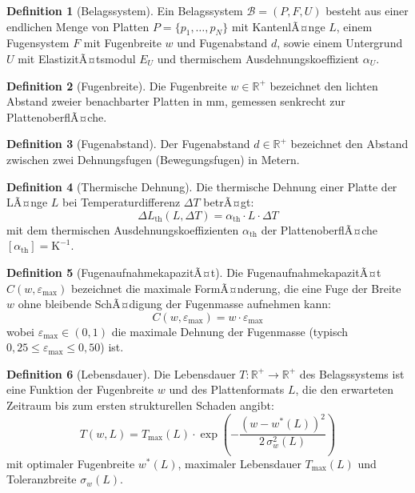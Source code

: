 ﻿\documentclass[a4paper,12pt]{article}
\theoremstyle{definition}
\newtheorem{definition}{Definition}
\begin{document}
\begin{definition}[Belagssystem]
	Ein Belagssystem $\mathcal{B} = (P, F, U)$ besteht aus einer endlichen
	Menge von Platten $P = \{p_1, \ldots, p_N\}$ mit KantenlÃ¤nge $L$,
	einem Fugensystem $F$ mit Fugenbreite $w$ und Fugenabstand $d$,
	sowie einem Untergrund $U$ mit ElastizitÃ¤tsmodul $E_U$ und
	thermischem Ausdehnungskoeffizient $\alpha_U$.
\end{definition}

\begin{definition}[Fugenbreite]
	Die Fugenbreite $w \in \mathbb{R}^+$ bezeichnet den lichten Abstand
	zweier benachbarter Platten in mm, gemessen senkrecht zur
	PlattenoberflÃ¤che.
\end{definition}

\begin{definition}[Fugenabstand]
	Der Fugenabstand $d \in \mathbb{R}^+$ bezeichnet den Abstand
	zwischen zwei Dehnungsfugen (Bewegungsfugen) in Metern.
\end{definition}

\begin{definition}[Thermische Dehnung]
	Die thermische Dehnung einer Platte der LÃ¤nge $L$ bei
	Temperaturdifferenz $\Delta T$ betrÃ¤gt:
	\[
	\Delta L_{\text{th}}(L,\Delta T) = \alpha_{\text{th}} \cdot L \cdot \Delta T
	\]
	mit dem thermischen Ausdehnungskoeffizienten $\alpha_{\text{th}}$
	der PlattenoberflÃ¤che $[\alpha_{\text{th}}] = \mathrm{K}^{-1}$.
\end{definition}

\begin{definition}[FugenaufnahmekapazitÃ¤t]
	Die FugenaufnahmekapazitÃ¤t $C(w, \varepsilon_{\max})$ bezeichnet die
	maximale FormÃ¤nderung, die eine Fuge der Breite $w$ ohne bleibende
	SchÃ¤digung der Fugenmasse aufnehmen kann:
	\[
	C(w, \varepsilon_{\max}) = w \cdot \varepsilon_{\max}
	\]
	wobei $\varepsilon_{\max} \in (0,1)$ die maximale Dehnung der
	Fugenmasse (typisch $0{,}25 \leq \varepsilon_{\max} \leq 0{,}50$) ist.
\end{definition}

\begin{definition}[Lebensdauer]
	Die Lebensdauer $T: \mathbb{R}^+ \to \mathbb{R}^+$ des Belagssystems
	ist eine Funktion der Fugenbreite $w$ und des Plattenformats $L$,
	die den erwarteten Zeitraum bis zum ersten strukturellen Schaden angibt:
	\[
	T(w, L) = T_{\max}(L) \cdot \exp\!\left(-\frac{(w - w^*(L))^2}{2\,\sigma_w^2(L)}\right)
	\]
	mit optimaler Fugenbreite $w^*(L)$, maximaler Lebensdauer $T_{\max}(L)$
	und Toleranzbreite $\sigma_w(L)$.
\end{definition}
\end{document}
